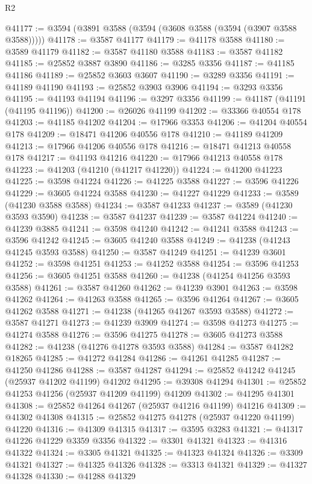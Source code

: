 \begin{lexlean}{R2}
\begin{coremodule}
@41177 := @3594 (@3891 @3588 (@3594 (@3608 @3588 (@3594 (@3907 @3588 @3588)))))
@41178 := @3587 @41177
@41179 := @41178 @3588
@41180 := @3589 @41179
@41182 := @3587 @41180 @3588
@41183 := @3587 @41182
@41185 := @25852 @3887 @3890
@41186 := @3285 @3356
@41187 := @41185 @41186
@41189 := @25852 @3603 @3607
@41190 := @3289 @3356
@41191 := @41189 @41190
@41193 := @25852 @3903 @3906
@41194 := @3293 @3356
@41195 := @41193 @41194
@41196 := @3297 @3356
@41199 := @41187 (@41191 (@41195 @41196))
@41200 := @26026 @41199
@41202 := @33366 @40554 @178
@41203 := @41185 @41202
@41204 := @17966 @3353
@41206 := @41204 @40554 @178
@41209 := @18471 @41206 @40556 @178
@41210 := @41189 @41209
@41213 := @17966 @41206 @40556 @178
@41216 := @18471 @41213 @40558 @178
@41217 := @41193 @41216
@41220 := @17966 @41213 @40558 @178
@41223 := @41203 (@41210 (@41217 @41220))
@41224 := @41200 @41223
@41225 := @3598 @41224
@41226 := @41225 @3588
@41227 := @3596 @41226
@41229 := @3605 @41224 @3588
@41230 := @41227 @41229
@41233 := @3589 (@41230 @3588 @3588)
@41234 := @3587 @41233
@41237 := @3589 (@41230 @3593 @3590)
@41238 := @3587 @41237
@41239 := @3587 @41224
@41240 := @41239 @3885
@41241 := @3598 @41240
@41242 := @41241 @3588
@41243 := @3596 @41242
@41245 := @3605 @41240 @3588
@41249 := @41238 (@41243 @41245 @3593 @3588)
@41250 := @3587 @41249
@41251 := @41239 @3601
@41252 := @3598 @41251
@41253 := @41252 @3588
@41254 := @3596 @41253
@41256 := @3605 @41251 @3588
@41260 := @41238 (@41254 @41256 @3593 @3588)
@41261 := @3587 @41260
@41262 := @41239 @3901
@41263 := @3598 @41262
@41264 := @41263 @3588
@41265 := @3596 @41264
@41267 := @3605 @41262 @3588
@41271 := @41238 (@41265 @41267 @3593 @3588)
@41272 := @3587 @41271
@41273 := @41239 @3909
@41274 := @3598 @41273
@41275 := @41274 @3588
@41276 := @3596 @41275
@41278 := @3605 @41273 @3588
@41282 := @41238 (@41276 @41278 @3593 @3588)
@41284 := @3587 @41282 @18265
@41285 := @41272 @41284
@41286 := @41261 @41285
@41287 := @41250 @41286
@41288 := @3587 @41287
@41294 := @25852 @41242 @41245 (@25937 @41202 @41199) @41202
@41295 := @39308 @41294
@41301 := @25852 @41253 @41256 (@25937 @41209 @41199) @41209
@41302 := @41295 @41301
@41308 := @25852 @41264 @41267 (@25937 @41216 @41199) @41216
@41309 := @41302 @41308
@41315 := @25852 @41275 @41278 (@25937 @41220 @41199) @41220
@41316 := @41309 @41315
@41317 := @3595 @3283
@41321 := @41317 @41226 @41229 @3359 @3356
@41322 := @3301 @41321
@41323 := @41316 @41322
@41324 := @3305 @41321
@41325 := @41323 @41324
@41326 := @3309 @41321
@41327 := @41325 @41326
@41328 := @3313 @41321
@41329 := @41327 @41328
@41330 := @41288 @41329

\end{coremodule}
\end{lexlean}
